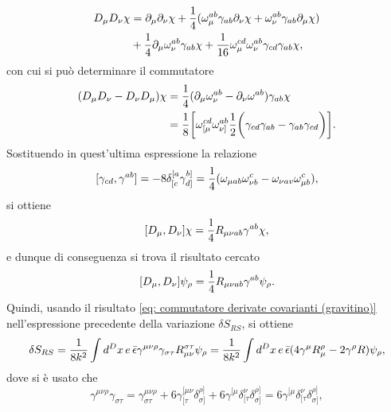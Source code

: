 \begin{equation}
    \begin{split}
        D_\mu D_\nu \chi &= \partial_\mu\partial_\nu \chi + \frac{1}{4}(\omega_\mu^{ab}\gamma_{ab}\partial_\nu\chi + \omega_\nu^{ab}\gamma_{ab}\partial_\mu\chi) \\
        &+ \frac{1}{4}\partial_\mu\omega_\nu^{ab}\gamma_{ab}\chi + \frac{1}{16}\omega_\mu^{cd}\omega_\nu^{ab}\gamma_{cd}\gamma_{ab}\chi,
    \end{split}
\end{equation}
con cui si può determinare il commutatore
\begin{equation}
    \begin{split}
        (D_\mu D_\nu - D_\nu D_\mu)\chi &= \frac{1}{4}(\partial_\mu\omega_\nu^{ab} - \partial_\nu\omega^{ab})\gamma_{ab}\chi \\
        &= \frac{1}{8}\bigg[\omega_{[\mu}^{cd}\omega_{\nu]}^{ab}\frac{1}{2}\bigg(\gamma_{cd}\gamma_{ab} - \gamma_{ab}\gamma_{cd}\bigg)\bigg].
    \end{split}
\end{equation}
Sostituendo in quest'ultima espressione la relazione 
\begin{equation}
    [\gamma_{cd},\gamma^{ab}] = -8\delta_{[c}^{[a}\gamma^{b]}_{d]} = \frac{1}{4}(\omega_{\mu ab}\omega^c_{\nu b} - \omega_{\nu av}\omega^c_{\mu b}),
\end{equation}
si ottiene
\begin{equation}
    [D_\mu,D_\nu]\chi = \frac{1}{4}R_{\mu\nu ab}\gamma^{ab}\chi,
\end{equation}
e dunque di conseguenza si trova il risultato cercato
\begin{equation}
\label{eq: commutatore derivate covarianti (gravitino)}
    [D_\mu,D_\nu]\psi_\rho = \frac{1}{4}R_{\mu\nu ab}\gamma^{ab}\psi_\rho.
\end{equation}
Quindi, usando il risultato \eqref{eq: commutatore derivate covarianti (gravitino)} nell'espressione precedente della variazione $\delta S_{RS}$, si ottiene 
\begin{equation}
    \begin{split}
        \delta S_{RS} = \frac{1}{8k^2}\int d^Dx\,e\,\bar{\epsilon}\gamma^{\mu\nu\rho}\gamma_{\sigma\tau}R_{\mu\nu}^{\sigma\tau}\psi_\rho = \frac{1}{8k^2}\int d^Dx\,e\,\bar{\epsilon}(4\gamma^\mu R_\mu^\rho - 2\gamma^\rho R)\psi_\rho,
    \end{split}
\end{equation}
dove si è usato che 
\begin{equation}
\label{eq: proprietà matrici gamma (5 indici)}
    \gamma^{\mu\nu\rho}\gamma_{\sigma\tau} = \gamma^{\mu\nu\rho}_{\sigma\tau} + 6\gamma^{[\mu\nu}_{[\tau}\delta^{\rho]}_{\sigma]} + 6\gamma^{[\mu}\delta^{\nu}_{[\tau}\delta^{\rho]}_{\sigma]} = 6\gamma^{[\mu}\delta^{\nu}_{[\tau}\delta^{\rho]}_{\sigma]},
\end{equation}
